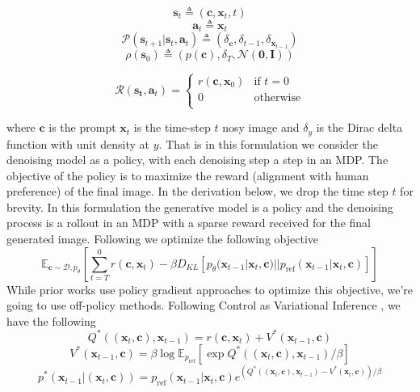 \documentclass[10pt,twocolumn,letterpaper]{article}
\newcommand{\x}{\ensuremath{\boldsymbol{x}}}
\newcommand{\vc}{\ensuremath{\boldsymbol{c}}}
\newcommand{\bbE}{\ensuremath{\mathbb{E}}}
\begin{document}
$$\mathbf{s}_t\triangleq(\vc, \x_t, t)$$
$$\mathbf{a}_t \triangleq\x_t$$
$$\mathcal{P}(\mathbf{s}_{t+1}|\mathbf{s}_t, \mathbf{a}_t) \triangleq (\delta_{\vc}, \delta_{t-1},\delta_{\x_{t-1}})$$
$$\rho(\mathbf{s}_0)\triangleq (p(\vc), \delta_T, \mathcal{N}(\mathbf{0}, \mathbf{I}))$$

\begin{equation}
  \mathcal{R}(\mathbf{s_t}, \mathbf{a}_t) =
    \begin{cases}
      r(\vc, \x_0) & \text{if $t=0$}\\
      0 & \text{otherwise}\\

    \end{cases}       
\end{equation}

where $\vc$ is the prompt $\x_t$ is the time-step $t$ nosy image and $\delta_y$ is the Dirac delta function with unit density at $y$. That is in this formulation we consider the denoising model as a policy, with each denoising step a step in an MDP. The objective of the policy is to maximize the reward (alignment with human preference) of the final image. In the derivation below, we drop the time step $t$ for brevity. In this formulation the generative model is a policy and the denoising process is a rollout in an MDP with a sparse reward received for the final generated image. Following \citep{dpok} we optimize the following objective
\begin{equation}
    \mathbb{E}_{\vc\sim\mathcal{D}, p_{\theta}}\left[\sum_{t=T}^0 r(\vc, \x_t)-\beta D_{KL}[p_{\theta}(\x_{t-1}|\x_t, \vc)||p_{\text{ref}}(\x_{t-1}|\x_t, \vc)]\right]
\end{equation}
While prior works \citep{ddpo, dpok} use policy gradient approaches to optimize this objective, we're going to use off-policy methods. Following Control as Variational Inference \cite{levine2018reinforcement}, we have the following
\begin{equation}\label{eq:critic}
Q^*((\x_t, \vc), \x_{t-1}) = r(\vc, \x_t) +  V^*(\x_{t-1}, \vc)    
\end{equation}
\begin{equation}\label{eq:value}
V^*(\x_{t-1}, \vc) =  \beta\log\bbE_{p_{\text{ref}}}\left[\exp{Q^*((\x_t, \vc), \x_{t-1})/\beta}\right]   
\end{equation}
\begin{equation}\label{eq:policy}
p^*(\x_{t-1}|(\x_t, \vc)) = p_{\text{ref}}(\x_{t-1}|\x_t, \vc)e^{(Q^*((\x_t, \vc), \x_{t-1})- V^*(\x_t, \vc) )/\beta}   
\end{equation}
\end{document}
